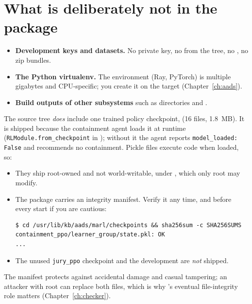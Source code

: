 \section{What is deliberately not in the package}
\begin{itemize}
\item \textbf{Development keys and datasets.} No private key, no  from the tree, no , no zip bundles.
\item \textbf{The Python virtualenv.} The  environment (Ray, PyTorch) is multiple gigabytes and CPU-specific; you create it on the target (Chapter~\ref{ch:aads}).
\item \textbf{Build outputs of other subsystems} such as  directories and .
\end{itemize}
The  source tree \emph{does} include one trained policy checkpoint, 
(16  files, 1.8~MB). It is shipped because the containment agent loads it at runtime
(\texttt{RLModule.from\_checkpoint} in ); without it the agent reports
\texttt{model\_loaded: False} and recommends no containment. Pickle files execute code when loaded, so:
\begin{itemize}
\item They ship root-owned and not world-writable, under , which only root may modify.
\item The package carries an integrity manifest. Verify it any time, and before every start if you are cautious:
\begin{lstlisting}[style=console]
$ cd /usr/lib/kb/aads/marl/checkpoints && sha256sum -c SHA256SUMS
containment_ppo/learner_group/state.pkl: OK
...
\end{lstlisting}
\item The unused \texttt{jury\_ppo} checkpoint and the development  are \emph{not} shipped.
\end{itemize}
The manifest protects against accidental damage and casual tampering; an attacker with root can replace both
files, which is why 's eventual file-integrity role matters (Chapter~\ref{ch:checker}).
